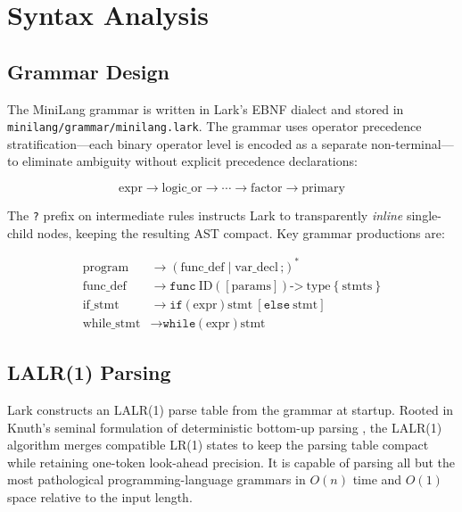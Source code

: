\documentclass[conference]{IEEEtran}
\begin{document}
\section{Syntax Analysis}
\label{sec:parser}

\subsection{Grammar Design}

The MiniLang grammar is written in Lark's EBNF dialect and stored in
\texttt{minilang/grammar/minilang.lark}. The grammar uses operator
precedence stratification---each binary operator level is encoded as a
separate non-terminal---to eliminate ambiguity without explicit
precedence declarations:

\[
  \text{expr} \rightarrow \text{logic\_or} \rightarrow
  \cdots \rightarrow \text{factor} \rightarrow \text{primary}
\]

The \texttt{?} prefix on intermediate rules instructs Lark to
transparently \textit{inline} single-child nodes, keeping the resulting
AST compact. Key grammar productions are:

\begin{align}
  \text{program}    &\rightarrow (\text{func\_def} \mid \text{var\_decl}\, \texttt{;})^* \label{eq:prog} \\
  \text{func\_def}  &\rightarrow \texttt{func}\ \text{ID}\ \texttt{(}\ [\text{params}]\ \texttt{)}\ \texttt{->}\ \text{type}\ \texttt{\{}\ \text{stmts}\ \texttt{\}} \label{eq:func} \\
  \text{if\_stmt}   &\rightarrow \texttt{if}\ \texttt{(}\ \text{expr}\ \texttt{)}\ \text{stmt}\ [\texttt{else}\ \text{stmt}] \label{eq:if} \\
  \text{while\_stmt}&\rightarrow \texttt{while}\ \texttt{(}\ \text{expr}\ \texttt{)}\ \text{stmt} \label{eq:while}
\end{align}

\subsection{LALR(1) Parsing}

Lark constructs an LALR(1) parse table from the grammar at startup.
Rooted in Knuth's seminal formulation of deterministic bottom-up
parsing \cite{knuth1965}, the LALR(1) algorithm \cite{lalr} merges
compatible LR(1) states to keep the parsing table compact while retaining
one-token look-ahead precision. It is capable of parsing all but the most
pathological programming-language grammars in $O(n)$ time and $O(1)$ space
relative to the input length.
\end{document}
